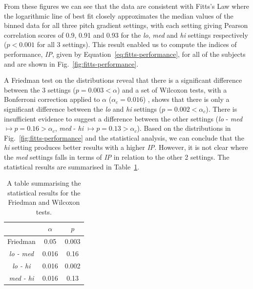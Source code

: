 \documentclass[sigconf, review=true, screen=true, anonymous=true]{acmart}
\begin{document}
From these figures we can see that the data are consistent with Fitts's Law where the logarithmic line of best fit closely approximates the median values of the binned data for all three pitch gradient settings, with each setting giving Pearson correlation scores of 0.9, 0.91 and 0.93 for the \emph{lo}, \emph{med} and \emph{hi} settings respectively ($p < 0.001$ for all 3 settings). This result enabled us to compute the indices of performance, \emph{IP}, given by Equation~\ref{eq:fitts-performance}, for all of the subjects and are shown in Fig.~\ref{fig:fitts-performance}.

A Friedman test on the distributions reveal that there is a significant difference between the 3 settings ($p=0.003<\alpha$) and a set of Wilcoxon tests, with a Bonferroni correction applied to $\alpha$ ($\alpha_c=0.016$) , shows that there is only a significant difference between the \emph{lo} and \emph{hi} settings ($p=0.002<\alpha_c$). There is insufficient evidence to suggest a difference between the other settings (\emph{lo} - \emph{med} $\mapsto p=0.16>\alpha_c$, \emph{med} - \emph{hi} $\mapsto p=0.13>\alpha_c$). Based on the distributions in Fig.~\ref{fig:fitts-performance} and the statistical analysis, we can conclude that the \emph{hi} setting produces better results with a higher \emph{IP}. However, it is not clear where the \emph{med} settings falls in terms of \emph{IP} in relation to the other 2 settings. The statistical results are summarised in Table~\ref{tab:fitts-results}.%

\begin{table}
  \centering
  \caption{A table summarising the statistical results for the Friedman and Wilcoxon tests.}
  \label{tab:fitts-results}
  \begin{tabular}{ccc}
    \toprule
    & $\alpha$ & $p$ \\\hline
    Friedman & 0.05 & 0.003 \\ 
    \emph{lo - med} & 0.016 & 0.16 \\ 
    \emph{lo - hi}  & 0.016 & 0.002 \\ 
    \emph{med - hi} & 0.016 & 0.13 \\
    \bottomrule
  \end{tabular}
\end{table}


\end{document}
